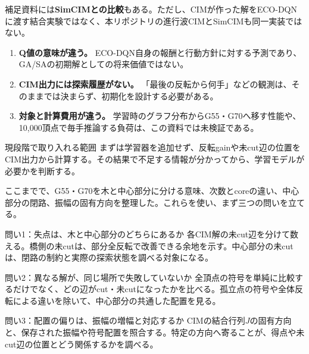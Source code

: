 補足資料には\textbf{SimCIMとの比較}もある。ただし、CIMが作った解をECO-DQNに渡す結合実験ではなく、本リポジトリの進行波CIMとSimCIMも同一実装ではない。

\begin{center}
\end{center}

\begin{enumerate}
\item \textbf{Q値の意味が違う。} ECO-DQN自身の報酬と行動方針に対する予測であり、GA/SAの初期解としての将来価値ではない。
\item \textbf{CIM出力には探索履歴がない。} 「最後の反転から何手」などの観測は、そのままでは決まらず、初期化を設計する必要がある。
\item \textbf{対象と計算費用が違う。} 学習時のグラフ分布からG55・G70へ移す性能や、10,000頂点で毎手推論する負荷は、この資料では未検証である。
\end{enumerate}

\begin{point}{現段階で取り入れる範囲}
まずは学習器を追加せず、反転gainや未cut辺の位置をCIM出力から計算する。その結果で不足する情報が分かってから、学習モデルが必要かを判断する。
\end{point}

\newpage
{}
ここまでで、G55・G70を木と中心部分に分ける意味、次数とcoreの違い、中心部分の閉路、振幅の固有方向を整理した。これらを使い、まず三つの問いを立てる。

\begin{point}{問い1：失点は、木と中心部分のどちらにあるか}
各CIM解の未cut辺を分けて数える。橋側の未cutは、部分全反転で改善できる余地を示す。中心部分の未cutは、閉路の制約と実際の探索状態を調べる対象になる。
\end{point}
\begin{point}{問い2：異なる解が、同じ場所で失敗していないか}
全頂点の符号を単純に比較するだけでなく、どの辺がcut・未cutになったかを比べる。孤立点の符号や全体反転による違いを除いて、中心部分の共通した配置を見る。
\end{point}
\begin{point}{問い3：配置の偏りは、振幅の増幅と対応するか}
CIMの結合行列$J$の固有方向と、保存された振幅や符号配置を照合する。特定の方向へ寄ることが、得点や未cut辺の位置とどう関係するかを調べる。
\end{point}

